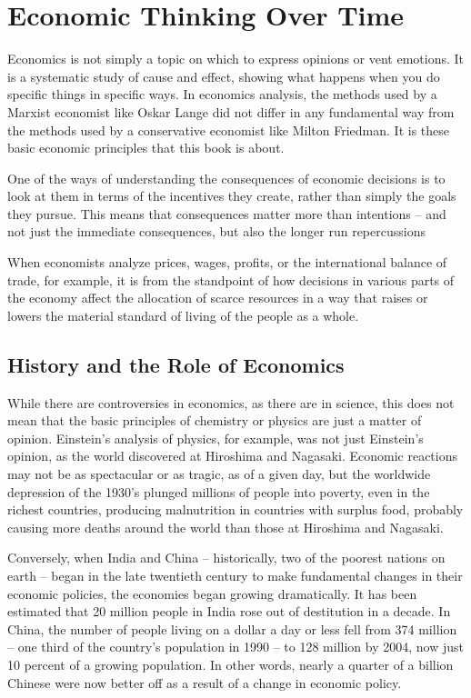
\section{Economic Thinking Over Time}

Economics is not simply a topic on which to express opinions or vent emotions. It is a systematic study of cause and effect, showing what happens when you do specific things in specific ways. In economics analysis, the methods used by a Marxist economist like Oskar Lange did not differ in any fundamental way from the methods used by a conservative economist like Milton Friedman. It is these basic economic principles that this book is about.

One of the ways of understanding the consequences of economic decisions is to look at them in terms of the incentives they create, rather than simply the goals they pursue. This means that consequences matter more than intentions – and not just the immediate consequences, but also the longer run repercussions 

When economists analyze prices, wages, profits, or the international balance of trade, for example, it is from the standpoint of how decisions in various parts of the economy affect the allocation of scarce resources in a way that raises or lowers the material standard of living of the people as a whole.

\subsection{History and the Role of Economics}

While there are controversies in economics, as there are in science, this does not mean that the basic principles of chemistry or physics are just a matter of opinion. Einstein’s analysis of physics, for example, was not just Einstein’s opinion, as the world discovered at Hiroshima and Nagasaki. Economic reactions may not be as spectacular or as tragic, as of a given day, but the worldwide depression of the 1930’s plunged millions of people into poverty, even in the richest countries, producing malnutrition in countries with surplus food, probably causing more deaths around the world than those at Hiroshima and Nagasaki.

Conversely, when India and China – historically, two of the poorest nations on earth – began in the late twentieth century to make fundamental changes in their economic policies, the economies began growing dramatically. It has been estimated that 20 million people in India rose out of destitution in a decade. In China, the number of people living on a dollar a day or less fell from 374 million – one third of the country’s population in 1990 – to 128 million by 2004, now just 10 percent of a growing population. In other words, nearly a quarter of a billion Chinese were now better off as a result of a change in economic policy.

